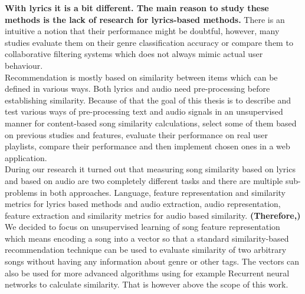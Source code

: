  {\bf With lyrics it is a bit different. The main reason to study these methods is the lack of research for lyrics-based methods.} There is an intuitive a notion that their performance might be doubtful, however, many studies evaluate them on their genre classification accuracy \cite{DBLP:journals/corr/Tsaptsinos17} or compare them to collaborative filtering systems \cite{Gossi2016LyricBasedMR} which does not always mimic actual user behaviour. \\
Recommendation is mostly based on similarity between items which can be defined in various ways. Both lyrics and audio need pre-processing before establishing similarity.  Because of that the goal of this thesis is to describe and test various ways of pre-processing text and audio signals in an unsupervised manner for content-based song similarity calculations, select some of them based on previous studies and features, evaluate their performance on real user playlists, compare their performance and then implement chosen ones in a web application.\\
During our research it turned out that measuring song similarity based on lyrics and based on audio are two completely different tasks and there are multiple sub-problems in both approaches.  Language, feature representation and similarity metrics for lyrics based methods and audio extraction, audio representation, feature extraction and similarity metrics for audio based similarity. {\bf (Therefore,)} We decided to focus on unsupervised learning of song feature representation which means encoding a song into a vector so that a standard similarity-based recommendation technique can be used to evaluate similarity of two arbitrary songs without having any information about genre or other tags. The vectors can also be used for more advanced algorithms using for example Recurrent neural networks to calculate similarity. That is however above the scope of this work. \\
